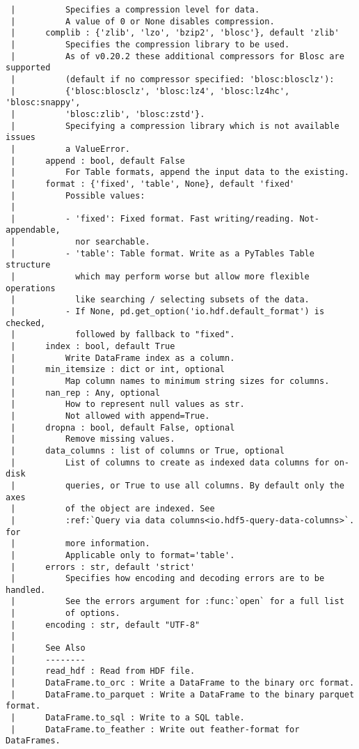 \documentclass[
  letterpaper,
  DIV=11,
  numbers=noendperiod]{scrreprt}
\begin{document}
\begin{verbatim}
 |          Specifies a compression level for data.
 |          A value of 0 or None disables compression.
 |      complib : {'zlib', 'lzo', 'bzip2', 'blosc'}, default 'zlib'
 |          Specifies the compression library to be used.
 |          As of v0.20.2 these additional compressors for Blosc are supported
 |          (default if no compressor specified: 'blosc:blosclz'):
 |          {'blosc:blosclz', 'blosc:lz4', 'blosc:lz4hc', 'blosc:snappy',
 |          'blosc:zlib', 'blosc:zstd'}.
 |          Specifying a compression library which is not available issues
 |          a ValueError.
 |      append : bool, default False
 |          For Table formats, append the input data to the existing.
 |      format : {'fixed', 'table', None}, default 'fixed'
 |          Possible values:
 |      
 |          - 'fixed': Fixed format. Fast writing/reading. Not-appendable,
 |            nor searchable.
 |          - 'table': Table format. Write as a PyTables Table structure
 |            which may perform worse but allow more flexible operations
 |            like searching / selecting subsets of the data.
 |          - If None, pd.get_option('io.hdf.default_format') is checked,
 |            followed by fallback to "fixed".
 |      index : bool, default True
 |          Write DataFrame index as a column.
 |      min_itemsize : dict or int, optional
 |          Map column names to minimum string sizes for columns.
 |      nan_rep : Any, optional
 |          How to represent null values as str.
 |          Not allowed with append=True.
 |      dropna : bool, default False, optional
 |          Remove missing values.
 |      data_columns : list of columns or True, optional
 |          List of columns to create as indexed data columns for on-disk
 |          queries, or True to use all columns. By default only the axes
 |          of the object are indexed. See
 |          :ref:`Query via data columns<io.hdf5-query-data-columns>`. for
 |          more information.
 |          Applicable only to format='table'.
 |      errors : str, default 'strict'
 |          Specifies how encoding and decoding errors are to be handled.
 |          See the errors argument for :func:`open` for a full list
 |          of options.
 |      encoding : str, default "UTF-8"
 |      
 |      See Also
 |      --------
 |      read_hdf : Read from HDF file.
 |      DataFrame.to_orc : Write a DataFrame to the binary orc format.
 |      DataFrame.to_parquet : Write a DataFrame to the binary parquet format.
 |      DataFrame.to_sql : Write to a SQL table.
 |      DataFrame.to_feather : Write out feather-format for DataFrames.

\end{verbatim}
\end{document}
